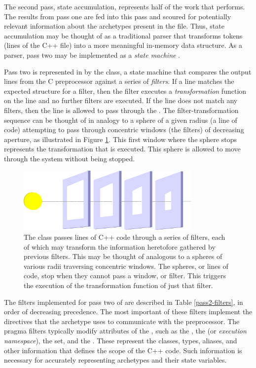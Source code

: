 The second pass, state accumulation, represents half of the work that \cycpp performs.
The results from pass one are fed into this pass and scoured for 
potentially relevant information about the archetypes present in the file. 
Thus, state accumulation 
may be thought of as a traditional parser that transforms tokens (lines of the 
C++ file) into a more meaningful in-memory data structure. As a parser, pass two 
may be implemented as a \emph{state machine}
\cite{mertz2003text,wagner2006modeling}.

Pass two is represented in \cycpp by the  class,  a
state machine that compares the output lines from the C preprocessor against a series of \emph{filters}.  If a line matches the expected structure 
for a filter, then the filter executes a \emph{transformation} function on the 
line and no further filters are executed. If the line does not match any 
filters, then the line is allowed to pass through the .  
The filter-transformation sequence can be thought of in analogy to a sphere of 
a given radius (a line of code) attempting to pass through concentric windows 
(the filters) of decreasing aperture, as illustrated in Figure \ref{filter-analogy}. 
This first window where the sphere stops 
represents the transformation that is executed.  This sphere is allowed to move 
through the system without being stopped.

\begin{figure}[htb]
\centering
\includegraphics[width=0.8\textwidth]{filter-analogy.eps}
\caption{The  class passes lines of C++ code through 
a series of filters, each of which may transform the information heretofore gathered
by previous filters. 
This may be thought of analogous to a spheres of various radii traversing 
concentric windows.  The spheres, or lines of code, stop when they cannot pass a  
window, or filter. This triggers the execution of the transformation function of just 
that filter.}
\label{filter-analogy}
\end{figure}

The filters implemented for pass two of \cycpp are described in Table \ref{pass2-filters}, 
in order of decreasing precedence. The most important of these filters implement 
the  directives that the archetype uses to communicate
with the preprocessor.  The pragma filters typically modify attributes of
the , such as the , the  
(or \emph{execution namespace}), the  set, and the . 
These represent the classes, types, aliases, and other information that defines
the scope of the C++ code. Such information is necessary 
for accurately representing archetypes and their state variables. 

